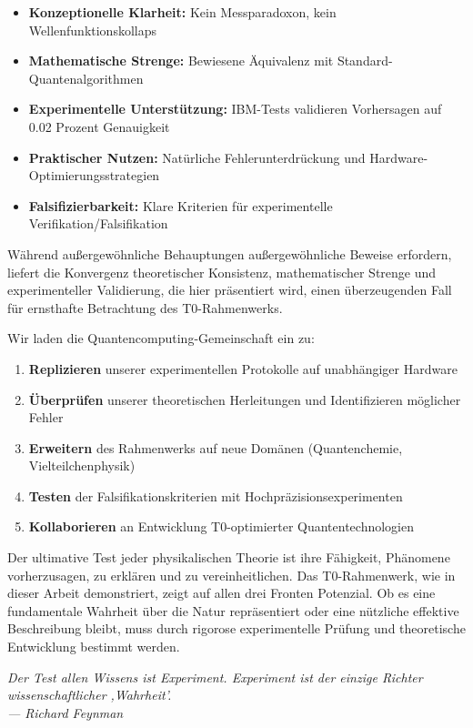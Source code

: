 \begin{itemize}
	\item \textbf{Konzeptionelle Klarheit:} Kein Messparadoxon, kein Wellenfunktionskollaps
	\item \textbf{Mathematische Strenge:} Bewiesene Äquivalenz mit Standard-Quantenalgorithmen
	\item \textbf{Experimentelle Unterstützung:} IBM-Tests validieren Vorhersagen auf 0.02 Prozent Genauigkeit
	\item \textbf{Praktischer Nutzen:} Natürliche Fehlerunterdrückung und Hardware-Optimierungsstrategien
	\item \textbf{Falsifizierbarkeit:} Klare Kriterien für experimentelle Verifikation/Falsifikation
\end{itemize}

Während außergewöhnliche Behauptungen außergewöhnliche Beweise erfordern, liefert die Konvergenz theoretischer Konsistenz, mathematischer Strenge und experimenteller Validierung, die hier präsentiert wird, einen überzeugenden Fall für ernsthafte Betrachtung des T0-Rahmenwerks.

Wir laden die Quantencomputing-Gemeinschaft ein zu:
\begin{enumerate}
	\item \textbf{Replizieren} unserer experimentellen Protokolle auf unabhängiger Hardware
	\item \textbf{Überprüfen} unserer theoretischen Herleitungen und Identifizieren möglicher Fehler
	\item \textbf{Erweitern} des Rahmenwerks auf neue Domänen (Quantenchemie, Vielteilchenphysik)
	\item \textbf{Testen} der Falsifikationskriterien mit Hochpräzisionsexperimenten
	\item \textbf{Kollaborieren} an Entwicklung T0-optimierter Quantentechnologien
\end{enumerate}

Der ultimative Test jeder physikalischen Theorie ist ihre Fähigkeit, Phänomene vorherzusagen, zu erklären und zu vereinheitlichen. Das T0-Rahmenwerk, wie in dieser Arbeit demonstriert, zeigt auf allen drei Fronten Potenzial. Ob es eine fundamentale Wahrheit über die Natur repräsentiert oder eine nützliche effektive Beschreibung bleibt, muss durch rigorose experimentelle Prüfung und theoretische Entwicklung bestimmt werden.

\begin{center}
	\textit{Der Test allen Wissens ist Experiment. Experiment ist der einzige Richter wissenschaftlicher ,Wahrheit'.}\\
	\textit{--- Richard Feynman}
\end{center}

